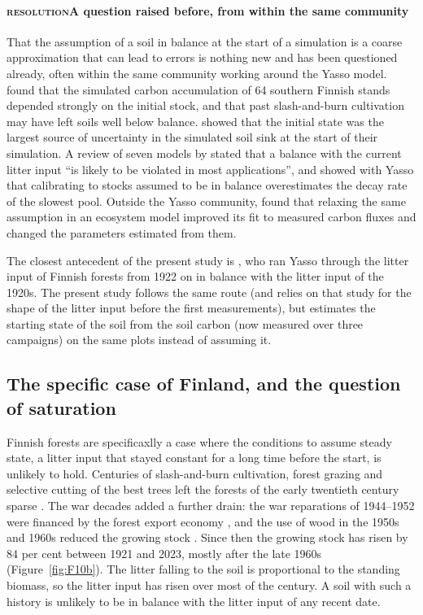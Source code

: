 \documentclass[11pt]{article}
\newcommand{\beat}[1]{\textcolor{black!45}{\textsc{\small #1}}\enspace}
\begin{document}
\paragraph{\beat{resolution}A question raised before, from within the same community}

That the assumption of a soil in balance at the start of a simulation is a coarse approximation that can lead to errors is nothing new and has been questioned already, often within the same community working around the Yasso model. 
\citet{Peltoniemi2004} found that the simulated carbon accumulation of 64 southern Finnish stands depended strongly on the initial stock, and that past slash-and-burn cultivation may have left soils well below balance.
\citet{Peltoniemi2006} showed that the initial state was the largest source of uncertainty in the simulated soil sink at the start of their simulation. A review of seven models by \citet{Peltoniemi2007} stated that a balance with the current litter input ``is likely to be violated in most applications'', and \citet{Wutzler2007} showed with Yasso that calibrating to stocks assumed to be in balance overestimates the decay rate of the slowest pool. Outside the Yasso community, \citet{Carvalhais2008}
found that relaxing the same assumption in an ecosystem model improved its fit to measured carbon
fluxes and changed the parameters estimated from them.

The closest antecedent of the present study is \citet{Liski2006}, who ran Yasso through the litter input of Finnish forests from 1922 on in balance with the litter input of the 1920s. The present study follows the same route (and relies on that study for the shape of the litter input before the first measurements), but estimates the starting state of the soil from the soil carbon (now measured over three campaigns) on the same plots instead of assuming it.

\subsection{The specific case of Finland, and the question of saturation}

Finnish forests are specificaxlly a case where the conditions to assume steady state, a litter input that stayed constant for a long time before the start, is unlikely to hold. 
Centuries of slash-and-burn cultivation, forest grazing and selective cutting of the best trees left the forests of the early twentieth century sparse \citep{Liski2006,Aakala2023,Korhonen2024}. The war decades added a further drain: the war reparations of 1944--1952 were financed by the forest export economy \citep{Mitrunen2024}, and the use of wood in the 1950s and 1960s reduced the growing stock \citep{Korhonen2021}. Since then the growing stock has risen by 84 per cent between 1921 and
2023, mostly after the late 1960s (Figure~\ref{fig:F10b}). 
The litter falling to the soil is proportional to the standing biomass, so the litter input has risen over most of the century. A soil with such a history is unlikely to be in balance with the litter input of any recent date.
\end{document}
